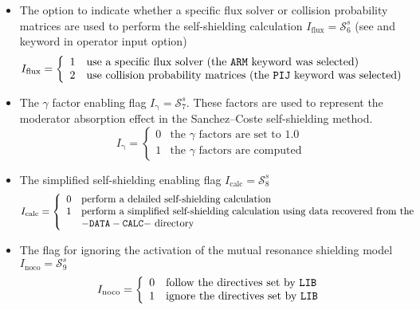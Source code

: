 \begin{itemize}
\item The option to indicate whether a specific flux solver or collision probability matrices
are used to perform the self-shielding calculation $I_{\mathrm{flux}}=\mathcal{S}^{s}_{6}$
(see  and  keyword in  operator input option)
\begin{displaymath}
I_{\mathrm{flux}} = \left\{
\begin{array}{rl}
 1 & \textrm{use a specific flux solver (the \moc{ARM} keyword was selected)} \\
 2 & \textrm{use collision probability matrices (the \moc{PIJ} keyword was selected)} 
\end{array} \right.
\end{displaymath}

\item The $\gamma$ factor enabling flag $I_{\mathrm{\gamma}}=\mathcal{S}^{s}_{7}$. These factors
are used to represent the moderator absorption effect in the Sanchez--Coste self-shielding method.
\begin{displaymath}
I_{\mathrm{\gamma}} = \left\{
\begin{array}{ll}
0 & \textrm{the $\gamma$ factors are set to 1.0} \\
1 & \textrm{the $\gamma$ factors are computed}
\end{array} \right.
\end{displaymath}

\item The simplified self-shielding enabling flag $I_{\mathrm{calc}}=\mathcal{S}^{s}_{8}$ 
\begin{displaymath}
I_{\mathrm{calc}} = \left\{
\begin{array}{ll}
0 & \textrm{perform a delailed self-shielding calculation} \\
1 & \textrm{perform a simplified self-shielding calculation using data recovered from the} \\
 & {\tt -DATA-CALC-} \textrm{ directory}
\end{array} \right.
\end{displaymath}

\item The flag for ignoring the activation of the mutual resonance shielding model $I_{\mathrm{noco}}=\mathcal{S}^{s}_{9}$ 
\begin{displaymath}
I_{\mathrm{noco}} = \left\{
\begin{array}{ll}
0 & \textrm{follow the directives set by {\tt LIB}} \\
1 & \textrm{ignore the directives set by {\tt LIB}}
\end{array} \right.
\end{displaymath}


\end{itemize}

